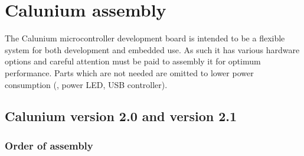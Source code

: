 \chapter{Calunium assembly}

The Calunium microcontroller development board is intended to be a
flexible system for both development and embedded use. As such it has
various hardware options and careful attention must be paid to
assembly it for optimum performance. Parts which are not needed are
omitted to lower power consumption (\eg, power LED, USB controller).

\section{Calunium version 2.0 and version 2.1}


\subsection{Order of assembly}

